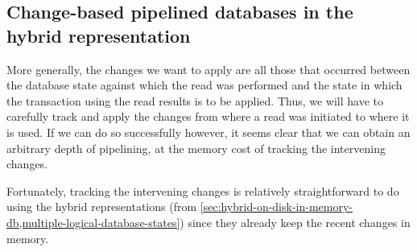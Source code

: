 \documentclass[11pt,a4paper]{article}
\begin{document}
\subsection{Change-based pipelined databases in the hybrid representation}

More generally, the changes we want to apply are all those that occurred between
the database state against which the read was performed and the state in which
the transaction using the read results is to be applied. Thus, we will have to
carefully track and apply the changes from where a read was initiated to where
it is used. If we can do so successfully however, it seems clear that we can
obtain an arbitrary depth of pipelining, at the memory cost of tracking the
intervening changes.

Fortunately, tracking the intervening changes is relatively straightforward to
do using the hybrid representations (from
\cref{sec:hybrid-on-disk-in-memory-db,multiple-logical-database-states}) since
they already keep the recent changes in memory.
\end{document}
